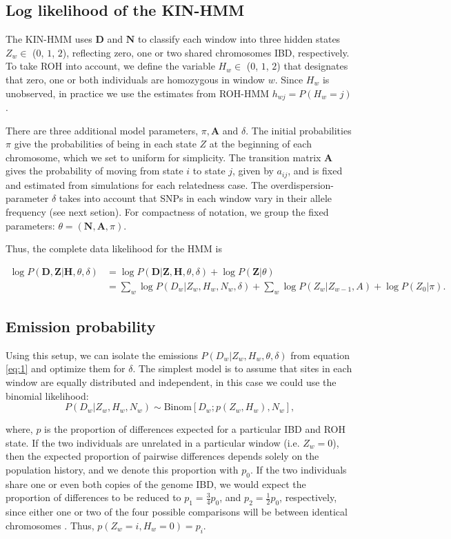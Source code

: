 \documentclass[12pt, letterpaper]{article}
\newcommand{\BZ}{\mathbf{Z}}
\newcommand{\BD}{\mathbf{D}}
\newcommand{\BN}{\mathbf{N}}
\newcommand{\BH}{\mathbf{H}}
\begin{document}
\subsection{Log likelihood of the KIN-HMM}\label{ll}
The KIN-HMM uses $\BD$ and $\BN$ to classify each window into three hidden states $Z_w \in$ ($0$, $1$, $2$), reflecting zero, one or two shared chromosomes IBD, respectively. To take ROH into account, we define the variable $H_w \in$ ($0$, $1$, $2$) that designates that zero, one or both individuals are homozygous in window $w$. Since $H_w$ is unobserved, in practice we use the estimates from ROH-HMM $h_{wj} = P(H_w = j)$. 

There are three additional model parameters, $\pi, \mathbf{A}$ and $\delta$. The initial probabilities $\pi$ give the probabilities of being in each state $Z$ at the beginning of each chromosome, which we set to uniform for simplicity. The transition matrix $\mathbf{A}$ gives the probability of moving from state $i$ to state $j$, given by $a_{ij}$, and is fixed and estimated from simulations for each relatedness case. The overdispersion-parameter $\delta$ takes into account that SNPs in each window vary in their allele frequency (see next setion).  For compactness of notation, we group the fixed parameters: $\theta = (\BN, \mathbf{A}, \pi)$. 

Thus, the complete data likelihood for the HMM is

\begin{align}\label{eq:1}
\log P(\BD,\BZ|\BH, \theta, \delta) &= \log P(\BD|\BZ,\BH, \theta, \delta) + \log P(\BZ |\theta) \nonumber\\
&= \sum_w \log P(D_w|Z_w,H_w, N_w, \delta) + \sum_w \log P(Z_w |Z_{w-1},A) + \log P(Z_0|\pi)\text{.}
\end{align}

\subsection{Emission probability}\label{B}

Using this setup, we can isolate the emissions $P(D_w | Z_w, H_w ,\theta, \delta)$ from equation \ref{eq:1} and optimize them for $\delta$. The simplest model is to assume that sites in each window are equally distributed and independent, in this case we could use the  binomial likelihood:
$$P(D_w|Z_w, H_w, N_w) \sim \text{Binom}[D_w ; p(Z_w, H_w), N_w] \text{,}$$

where, $p$ is the proportion of differences expected for a particular IBD and ROH state. If the two individuals are unrelated in a particular window (i.e. $Z_w = 0$), then the expected proportion of pairwise differences depends solely on the population history, and we denote this proportion with $p_0$. If the two individuals share one or even both copies of the genome IBD, we would expect the proportion of differences to be reduced to $p_1 = \frac{3}{4} p_0$, and $p_2 = \frac{1}2 p_0$, respectively, since either one or two of the four possible comparisons will be between identical chromosomes \cite{kuhn_estimating_2018}. Thus, $p(Z_w=i, H_w=0) = p_i$.
\end{document}
